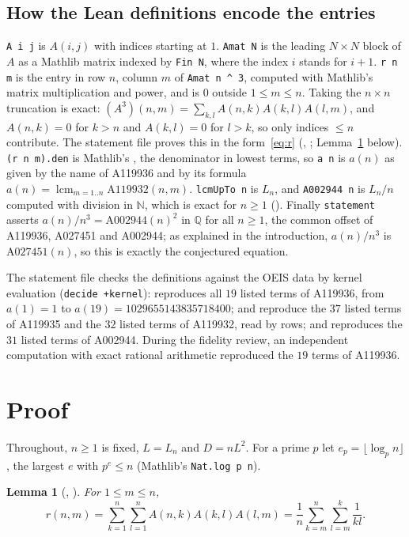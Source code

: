 \documentclass[11pt]{amsart}
\theoremstyle{plain}
\newtheorem{lemma}[theorem]{Lemma}
\theoremstyle{definition}
\newcommand{\code}[1]{\texttt{#1}}
\newcommand{\N}{\mathbb{N}}
\newcommand{\Q}{\mathbb{Q}}
\DeclareMathOperator{\lcm}{lcm}
\begin{document}
\subsection*{How the Lean definitions encode the entries}
\code{A i j} is $A(i,j)$ with indices starting at $1$. \code{Amat N} is the leading $N\times N$ block of $A$ as a Mathlib matrix indexed by \code{Fin N}, where the index $i$ stands for $i+1$. \code{r n m} is the entry in row $n$, column $m$ of \code{Amat n \^{} 3}, computed with Mathlib's matrix multiplication and power, and is $0$ outside $1\le m\le n$. Taking the $n\times n$ truncation is exact: $(A^3)(n,m)=\sum_{k,l}A(n,k)A(k,l)A(l,m)$, and $A(n,k)=0$ for $k>n$ and $A(k,l)=0$ for $l>k$, so only indices $\le n$ contribute. The statement file proves this in the form~\eqref{eq:r} (, ; Lemma~\ref{lem:explicit} below). \code{(r n m).den} is Mathlib's , the denominator in lowest terms, so \code{a n} is $a(n)$ as given by the name of A119936 and by its formula $a(n)=\lcm_{m=1..n}\mathrm{A119932}(n,m)$. \code{lcmUpTo n} is $L_n$, and \code{A002944 n} is $L_n/n$ computed with division in $\N$, which is exact for $n\ge1$ (). Finally \code{statement} asserts $a(n)/n^3=\mathrm{A002944}(n)^2$ in $\Q$ for all $n\ge1$, the common offset of A119936, A027451 and A002944; as explained in the introduction, $a(n)/n^3$ is $\mathrm{A027451}(n)$, so this is exactly the conjectured equation.

The statement file checks the definitions against the OEIS data by kernel evaluation (\texttt{decide +kernel}):  reproduces all $19$ listed terms of A119936, from $a(1)=1$ to $a(19)=1029655143835718400$;  and  reproduce the $37$ listed terms of A119935 and the $32$ listed terms of A119932, read by rows; and  reproduces the $31$ listed terms of A002944. During the fidelity review, an independent computation with exact rational arithmetic reproduced the $19$ terms of A119936.

\section{Proof}\label{sec:proof}

Throughout, $n\ge1$ is fixed, $L=L_n$ and $D=nL^2$. For a prime $p$ let $e_p=\lfloor\log_p n\rfloor$, the largest $e$ with $p^e\le n$ (Mathlib's \code{Nat.log p n}).

\begin{lemma}[, ]\label{lem:explicit}
For $1\le m\le n$,
\[
  r(n,m)=\sum_{k=1}^n\sum_{l=1}^nA(n,k)A(k,l)A(l,m)=\frac1n\sum_{k=m}^n\sum_{l=m}^k\frac1{kl}.
\]
\end{lemma}
\end{document}
